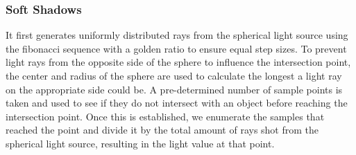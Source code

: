 \documentclass{article}
\begin{document}
    \newpage

    \subsubsection{Soft Shadows}
    It first generates uniformly distributed rays from the spherical light source using the fibonacci sequence 
    with a golden ratio to ensure equal step sizes. To prevent light rays from the opposite side of the sphere 
    to influence the intersection point, the center and radius of the sphere are used to calculate the longest 
    a light ray on the appropriate side could be. A pre-determined number of sample points is taken and used 
    to see if they do not intersect with an object before reaching the intersection point. Once this is 
    established, we enumerate the samples that reached the point and divide it by the total amount of rays 
    shot from the spherical light source, resulting in the light value at that point.
\end{document}
